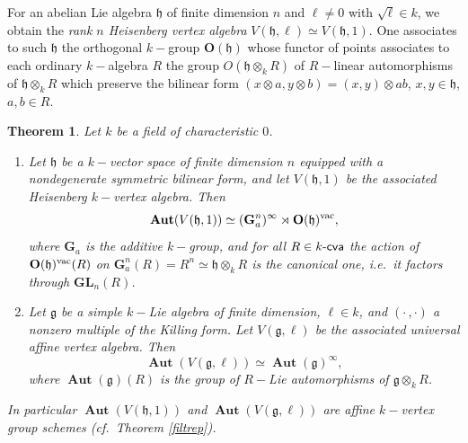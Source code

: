 \documentclass{article}
\newtheorem{thm}{Theorem}[section]
\theoremstyle{definition}
\def\BAut{\ensuremath{\operatorname{\mathbf{Aut}}}}
\def\kcva{\ensuremath{k\text{-\textup{\textsf{cva}}}}}
\begin{document}
    
    For an abelian Lie algebra $\mathfrak h$ of finite dimension $n$ and $\ell \neq 0$ with $\sqrt\ell \in k$, we obtain the \emph{rank $n$ Heisenberg vertex algebra} $V(\mathfrak h, \ell) \simeq V(\mathfrak h, 1)$.
One associates to such $\mathfrak h$ the orthogonal $k-$group $\mathbf O(\mathfrak h)$ whose  functor of points associates to each ordinary $k-$algebra $R$ the group $O(\mathfrak h \otimes_k R)$ of $R-$linear automorphisms of $\mathfrak h \otimes_k R$ which preserve the bilinear form $(x \otimes a, y \otimes b)= (x,y) \otimes ab$, $x,y \in \mathfrak h$, $a, b \in R$.
  
\begin{thm}\label{affheis} Let $k$ be a field of characteristic $0$.
    \begin{enumerate}[label = \textup{\alph*)}]
    \item Let $\mathfrak h$ be a $k-$vector space of finite dimension $n$ equipped with a nondegenerate symmetric bilinear form, and let $V(\mathfrak h,1)$ be the associated Heisenberg $k-$vertex algebra. Then 
    \[ \BAut(V(\mathfrak h, 1)) \simeq (\mathbf G_a^n)^\infty \rtimes \mathbf O(\mathfrak h)^{\rm vac}, \]
		    where  $\mathbf G_a$ is the additive $k-$group, and for all $R \in \kcva$ the action of $\mathbf{O}(\mathfrak h)^{\rm vac}(R)$ on $\mathbf G_a^n (R) = R^n \simeq \mathfrak h \otimes_k R$ is the canonical one, i.e.\ it factors through $\mathbf{GL}_n(R)$.
    \item Let $\mathfrak g$ be a simple $k-$Lie algebra of finite dimension, $\ell \in k$, and $(\cdot \,, \cdot)$ a nonzero multiple of the Killing form.
 Let $V(\mathfrak g, \ell)$ be the associated universal affine vertex algebra.
    Then 
    \[ \BAut(V(\mathfrak g, \ell)) \simeq \BAut(\mathfrak g)^\infty,\]
    where $\BAut(\mathfrak g)(R)$ is the group of $R-$Lie automorphisms of $\mathfrak g \otimes_k R$.
    \end{enumerate}
	In particular $\BAut(V(\mathfrak h, 1))$ and $\BAut(V(\mathfrak g, \ell))$ are affine $k-$vertex group schemes (cf.\ Theorem \ref{filtrep}).
\end{thm}
\end{document}
